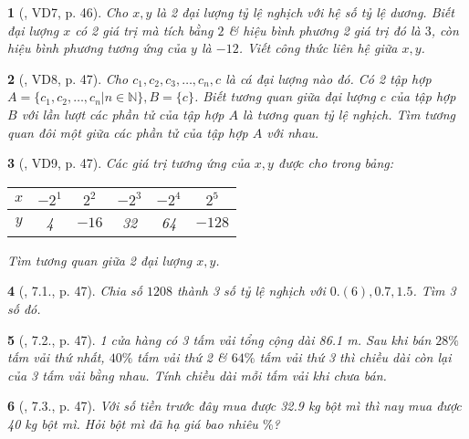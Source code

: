\documentclass{article}
\newtheorem{baitoan}{}
\begin{document}
\begin{baitoan}[\cite{Binh_boi_duong_Toan_7_tap_1}, VD7, p. 46]
	Cho $x,y$ là 2 đại lượng tỷ lệ nghịch với hệ số tỷ lệ dương. Biết đại lượng $x$ có 2 giá trị mà tích bằng $2$ \& hiệu bình phương 2 giá trị đó là $3$, còn hiệu bình phương tương ứng của $y$ là $-12$. Viết công thức liên hệ giữa $x,y$.
\end{baitoan}

\begin{baitoan}[\cite{Binh_boi_duong_Toan_7_tap_1}, VD8, p. 47]
	Cho $c_1,c_2,c_3,\ldots,c_n,c$ là cá đại lượng nào đó. Có 2 tập hợp $A = \{c_1,c_2,\ldots,c_n|n\in\mathbb{N}\},B = \{c\}$. Biết tương quan giữa đại lượng $c$ của tập hợp $B$ với lần lượt các phần tử của tập hợp $A$ là tương quan tỷ lệ nghịch. Tìm tương quan đôi một giữa các phần tử của tập hợp $A$ với nhau.
\end{baitoan}

\begin{baitoan}[\cite{Binh_boi_duong_Toan_7_tap_1}, VD9, p. 47]
	Các giá trị tương ứng của $x,y$ được cho trong bảng:
	\begin{table}[H]
		\centering
		\begin{tabular}{|c|c|c|c|c|c|}
			\hline
			$x$ & $-2^1$ & $2^2$ & $-2^3$ & $-2^4$ & $2^5$ \\
			\hline
			$y$ & 4 & $-16$ & 32 & 64 & $-128$ \\
			\hline
		\end{tabular}
	\end{table}
	\noindent Tìm tương quan giữa 2 đại lượng $x,y$.
\end{baitoan}

\begin{baitoan}[\cite{Binh_boi_duong_Toan_7_tap_1}, 7.1., p. 47]
	Chia số $1208$ thành 3 số tỷ lệ nghịch với $0.(6),0.7,1.5$. Tìm 3 số đó.
\end{baitoan}

\begin{baitoan}[\cite{Binh_boi_duong_Toan_7_tap_1}, 7.2., p. 47]
	1 cửa hàng có 3 tấm vải tổng cộng dài {\rm86.1 m}. Sau khi bán $28\%$ tấm vải thứ nhất, $40\%$ tấm vải thứ 2 \& $64\%$ tấm vải thứ 3 thì chiều dài còn lại của 3 tấm vải bằng nhau. Tính chiều dài mỗi tấm vải khi chưa bán.
\end{baitoan}

\begin{baitoan}[\cite{Binh_boi_duong_Toan_7_tap_1}, 7.3., p. 47]
	Với số tiền trước đây mua được {\rm32.9 kg} bột mì thì nay mua được {\rm40 kg} bột mì. Hỏi bột mì đã hạ giá bao nhiêu $\%$?
\end{baitoan}
\end{document}
